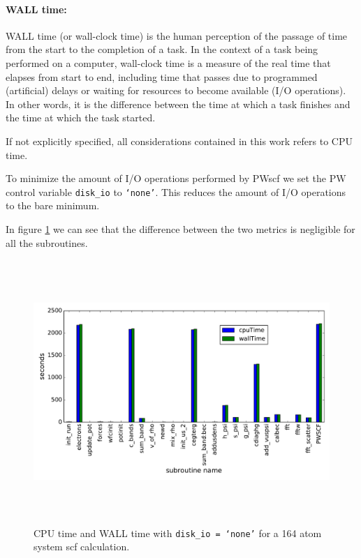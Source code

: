 \documentclass[a4paper,12pt]{article}
\begin{document}
\paragraph{WALL time: } WALL time (or wall-clock time) is the human perception of the passage of time from the start to the completion of a task. 
In the context of a task being performed on a computer, wall-clock time is a measure of the real time that elapses from start to end, including time that passes due to programmed (artificial) delays or waiting for resources to become available (I/O operations). 
In other words, it is the difference between the time at which a task finishes and the time at which the task started.

If not explicitly specified, all considerations contained in this work refers to CPU time.

To minimize the amount of I/O operations performed by PWscf we set the PW control variable \texttt{disk\_io} to \texttt{`none'}.
This reduces the amount of I/O operations to the bare minimum.

In figure \ref{fig:cpuwalltime} we can see that the difference between the two metrics is negligible for all the subroutines.

\begin{figure}[hhh!]
\begin{center}
	\includegraphics[width=\linewidth ,height=10cm]{cpuwalltime.pdf}	
	\caption{CPU time and WALL time with \texttt{disk\_io = `none'} for a 164 atom system scf calculation.}
	\label{fig:cpuwalltime}
\end{center}
\end{figure}
\end{document}
